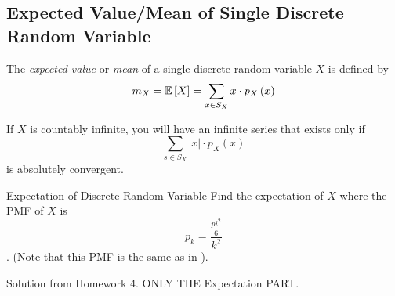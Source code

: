 	\subsection{Expected Value/Mean of Single Discrete Random Variable} \label{subsec:Expected Value of Single Discrete}
		\begin{definition} \label{def:Expected Value of Single Discrete}
			The \emph{expected value} or \emph{mean} of a single discrete random variable $X$ is defined by
			\begin{equation} \label{eq:Expected Value of Single Discrete}
				m_{X} = \operatorname{\operatorname{\mathbb{E}}} \left[ X \right] = \sum_{x \in S_{X}} x \cdot p_{X} \left( x \right)
			\end{equation}
			\begin{remark} \label{rmk:Expected Value of Single Discrete Countably Infinite}
				If $X$ is countably infinite, you will have an infinite series that exists only if
				\begin{equation} \label{eq:Expected Value of Single Discrete Countably Infinite}
					\sum_{s \in S_{X}} \lvert x \rvert \cdot p_{X} \left( x \right)
				\end{equation}
				is absolutely convergent.
			\end{remark}
		\end{definition}
		\begin{example}[Problem 3.27]{Expectation of Discrete Random Variable}
			Find the expectation of $X$ where the PMF of $X$ is \[p_{k} = \frac{\frac{pi^{2}}{6}}{k^{2}}\]. (Note that this PMF is the same as in ).
			
			\tcblower
			
			Solution from Homework 4. ONLY THE Expectation PART.
		\end{example}
	
